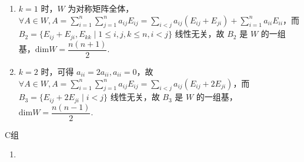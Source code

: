 \begin{enumerate}
\begin{enumerate}
              \item $k=1$ 时，$W$ 为对称矩阵全体，$\forall A\in W,A = \displaystyle\sum_{i=1}^n\displaystyle\sum_{j=1}^na_{ij}E_{ij}=\displaystyle\sum_{i<j}a_{ij}(E_{ij}+E_{ji})+\displaystyle\sum_{i=1}^na_{ii}E_{ii}$，而 $B_2=\{E_{ij}+E_{ji},E_{kk} \mid 1\leq i,j,k\leq n,i<j\}$ 线性无关，故 $B_2$ 是 $W$ 的一组基，$\mathrm{dim}W=\dfrac{n(n+1)}{2}$.

              \item $k=2$ 时，可得 $a_{ii}=2a_{ii},a_{ii}=0$，故 $\forall A\in W,A = \displaystyle\sum_{i=1}^n\displaystyle\sum_{j=1}^na_{ij}E_{ij}=\displaystyle\sum_{i<j}a_{ij}(E_{ij}+2E_{ji})$，而 $B_3=\{E_{ij}+2E_{ji} \mid i<j\}$ 线性无关，故 $B_3$ 是 $W$ 的一组基，$\mathrm{dim}W=\dfrac{n(n-1)}{2}$.
          \end{enumerate}
\end{enumerate}

\centerline{\heiti C组}
\begin{enumerate}
    \item
\end{enumerate}

\clearpage
